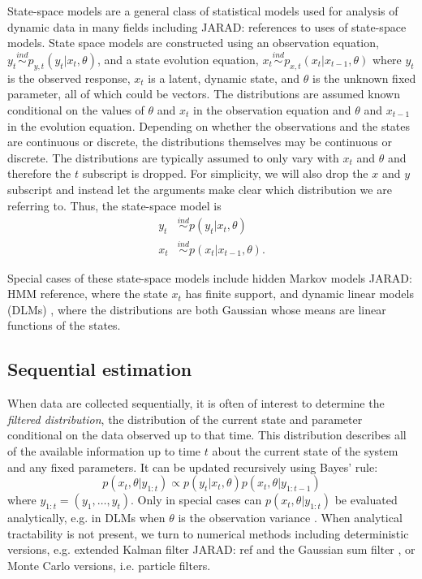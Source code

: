 \documentclass{elsarticle}
\newcommand{\jarad}[1]{{\color{red}JARAD: #1}}
\begin{document}
State-space models are a general class of statistical models used for analysis of dynamic data in many fields including \jarad{references to uses of state-space models}. State space models are constructed using an observation equation, $y_t \stackrel{ind}{\sim} p_{y,t}(y_t|x_t,\theta)$, and a state evolution equation, $x_t \stackrel{ind}{\sim} p_{x,t}(x_t|x_{t-1},\theta)$ where $y_t$ is the observed response, $x_t$ is a latent, dynamic state, and $\theta$ is the unknown fixed parameter, all of which could be vectors. The distributions are assumed known conditional on the values of $\theta$ and $x_t$ in the observation equation and $\theta$ and $x_{t-1}$ in the evolution equation. Depending on whether the observations and the states are continuous or discrete, the distributions themselves may be continuous or discrete. The distributions are typically assumed to only vary with $x_t$ and $\theta$ and therefore the $t$ subscript is dropped.
For simplicity, we will also drop the $x$ and $y$ subscript and instead let the arguments make clear which distribution we are referring to. Thus, the state-space model is
\begin{align*}
y_t &\stackrel{ind}{\sim} p(y_t|x_t,\theta) \\
x_t &\stackrel{ind}{\sim} p(x_t|x_{t-1},\theta).
\end{align*}

Special cases of these state-space models include hidden Markov models \jarad{HMM reference}, where the state $x_t$ has finite support, and dynamic linear models (DLMs) \citep{West:Harr:baye:1997}, where the distributions are both Gaussian whose means are linear functions of the states.

\subsection{Sequential estimation}

When data are collected sequentially, it is often of interest to determine the \emph{filtered distribution}, the distribution of the current state and parameter conditional on the data observed up to that time. This distribution describes all of the available information up to time $t$ about the current state of the system and any fixed parameters. It can be updated recursively using Bayes' rule:
\begin{equation}
p(x_t,\theta| y_{1:t}) \propto p(y_t|x_t,\theta)p(x_t,\theta|y_{1:t-1}) \label{eqn:filtered}
\end{equation}
where $y_{1:t} = (y_1,\ldots,y_t)$. Only in special cases can $p(x_t,\theta| y_{1:t})$ be evaluated analytically, e.g. in DLMs when $\theta$ is the observation variance \cite[Sec 4.3,][]{petris2009dynamic}. When analytical tractability is not present, we turn to numerical methods including deterministic versions, e.g. extended Kalman filter \jarad{ref} and the Gaussian sum filter \citep{Alsp:Sore:nonl:1972}, or Monte Carlo versions, i.e. particle filters.
\end{document}
